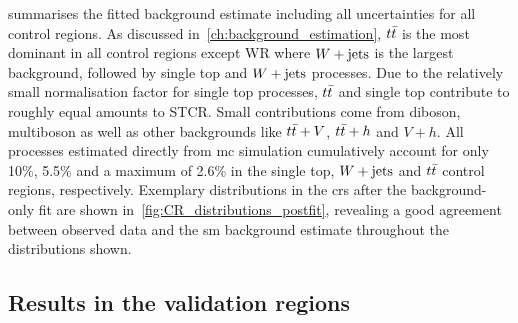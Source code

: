  summarises the fitted background estimate including all uncertainties for all control regions. As discussed in~\cref{ch:background_estimation}, $t\bar{t}$ is the most dominant in all control regions except WR where $W+\mathrm{jets}$ is the largest background, followed by single top and $W+\mathrm{jets}$ processes. Due to the relatively small normalisation factor for single top processes, $t\bar{t}$ and single top contribute to roughly equal amounts to STCR. Small contributions come from diboson, multiboson as well as other backgrounds like $t\bar{t}+V$, $t\bar{t}+h$ and $V+h$. All processes estimated directly from \gls{mc} simulation cumulatively account for only 10\%, 5.5\% and a maximum of 2.6\% in the single top, $W+\mathrm{jets}$ and $t\bar{t}$ control regions, respectively. Exemplary distributions in the \glspl{cr} after the background-only fit are shown in~\cref{fig:CR_distributions_postfit}, revealing a good agreement between observed data and the \gls{sm} background estimate throughout the distributions shown.

\subsection{Results in the validation regions}
	
